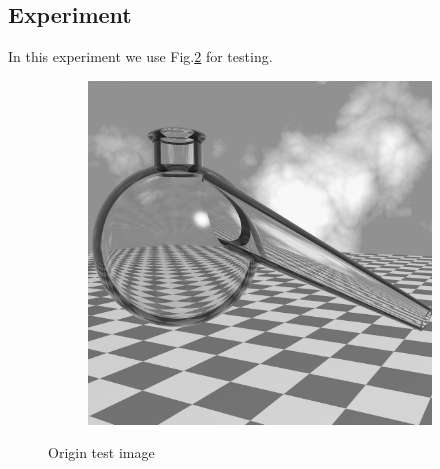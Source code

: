\subsection{Experiment}
In this experiment we use Fig.\ref{fig:origin} for testing.
\begin{figure}[h]
	\centering
	\begin{subfigure}[b]{0.45\linewidth}
		\includegraphics[width=\linewidth]{myfigure/p6/ray_trace_bottle.png}
		\caption{}
		\label{fig:origin1}
	\end{subfigure}
	\caption{Origin test image}
  	\label{fig:origin}
\end{figure}

